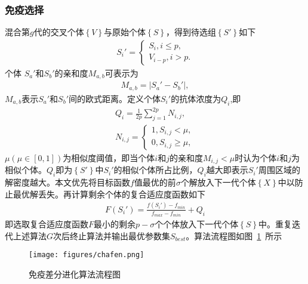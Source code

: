 \documentclass{whutmod}
\begin{document}
      \subsubsection{免疫选择}
    混合第$g$代的交叉个体$\left \{ V\right \}$与原始个体$\left \{ S \right \}$，得到待选组$\left \{ S '\right \}$如下
    \begin{gather*}
    S_i '=\left\{\begin{matrix}  S_i ,i\leqslant p,
    \\  V_{i-p},i>p.
    \end{matrix}\right.
    \end{gather*}
    个体 $S_a'$和$S_b '$的亲和度$M_{a,b}$可表示为
    \begin{gather*}
    M_{a,b}=|S_a'-S_b '|,
    \end{gather*}
    $M_{a,b}$表示$S_a'$和$S_b '$间的欧式距离。定义个体$S_i'$的抗体浓度为$Q_{i}$,即
    \begin{gather*}
    Q_{i}=\frac{1}{2p}\sum _{j=1}^{2p} N_{i,j},\\
    N_{i,j}=\left\{\begin{matrix}1,S_{i,j}< \mu,
    \\ 0,S_{i,j}\geqslant \mu  ,
    \end{matrix}\right.
    \end{gather*}
    $\mu(\mu\in[0,1])$为相似度阈值，即当个体$i$和$j$的亲和度$M_{i,j}<\mu$时认为个体$i$和$j$为相似个体。$Q_{i}$即为$\left \{ S'\right \}$中$S_i'$的相似个体所占比例，$Q_{i}$越大即表示$S_i '$周围区域的解密度越大。本文优先将目标函数$f$值最优的前$\sigma$个解放入下一代个体$\left \{ X\right \}$中以防止最优解丢失。再计算剩余个体的复合适应度函数如下
    \begin{gather*}
    F(S_i ')=\frac{f(S_i')-f_{min}}{f_{max}-f_{min}}+Q_{i}
    \end{gather*}
    即选取复合适应度函数$F$最小的剩余$p-\sigma$个个体放入下一代个体$\left \{ S\right \}$中。重复迭代上述算法$G$次后终止算法并输出最优参数集$S_{best}$。算法流程图如图~\ref{jndfg}~所示
    \begin{figure}[H]
    \centering
   	\texttt{[image: figures/chafen.png]}
   	\caption{免疫差分进化算法流程图}\label{jndfg}
    \end{figure}
\end{document}
